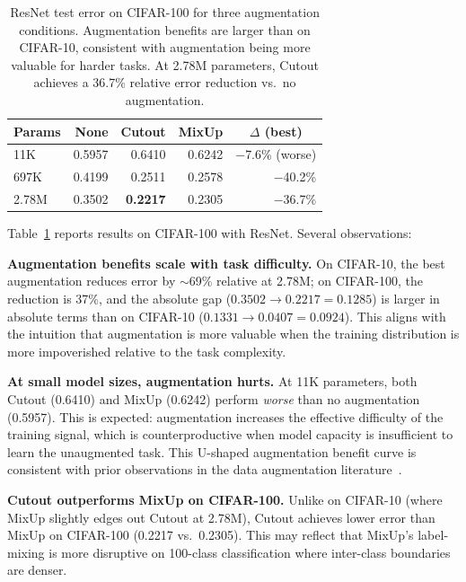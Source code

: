 \begin{table}[h]
\centering
\caption{ResNet test error on CIFAR-100 for three augmentation conditions. Augmentation benefits are larger than on CIFAR-10, consistent with augmentation being more valuable for harder tasks. At 2.78M parameters, Cutout achieves a 36.7\% relative error reduction vs.\ no augmentation.}
\label{tab:cifar100}
\small
\begin{tabular}{@{}lrrrr@{}}
\toprule
Params & None & Cutout & MixUp & \multicolumn{1}{c}{$\Delta$ (best)} \\
\midrule
11K   & 0.5957 & 0.6410 & 0.6242 & $-$7.6\% (worse) \\
697K  & 0.4199 & 0.2511 & 0.2578 & $-$40.2\% \\
2.78M & 0.3502 & \textbf{0.2217} & 0.2305 & $-$36.7\% \\
\bottomrule
\end{tabular}
\end{table}

Table~\ref{tab:cifar100} reports results on CIFAR-100 with ResNet. Several observations:

\textbf{Augmentation benefits scale with task difficulty.} On CIFAR-10, the best augmentation reduces error by $\sim$69\% relative at 2.78M; on CIFAR-100, the reduction is 37\%, and the absolute gap ($0.3502 \to 0.2217 = 0.1285$) is larger in absolute terms than on CIFAR-10 ($0.1331 \to 0.0407 = 0.0924$). This aligns with the intuition that augmentation is more valuable when the training distribution is more impoverished relative to the task complexity.

\textbf{At small model sizes, augmentation hurts.} At 11K parameters, both Cutout (0.6410) and MixUp (0.6242) perform \emph{worse} than no augmentation (0.5957). This is expected: augmentation increases the effective difficulty of the training signal, which is counterproductive when model capacity is insufficient to learn the unaugmented task. This U-shaped augmentation benefit curve is consistent with prior observations in the data augmentation literature~\cite{shorten2019survey}.

\textbf{Cutout outperforms MixUp on CIFAR-100.} Unlike on CIFAR-10 (where MixUp slightly edges out Cutout at 2.78M), Cutout achieves lower error than MixUp on CIFAR-100 (0.2217 vs.\ 0.2305). This may reflect that MixUp's label-mixing is more disruptive on 100-class classification where inter-class boundaries are denser.
